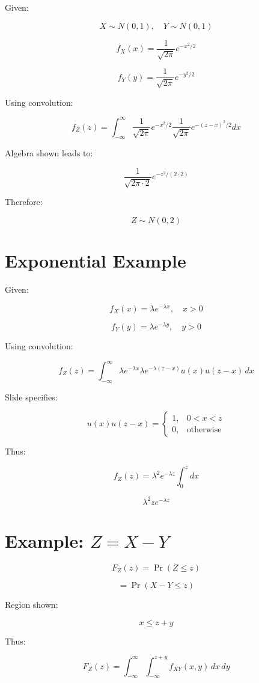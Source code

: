 \documentclass[12pt]{article}
\begin{document}
Given:

\[
X \sim N(0,1), \quad Y \sim N(0,1)
\]

\[
f_X(x)=\frac{1}{\sqrt{2\pi}}e^{-x^2/2}
\]

\[
f_Y(y)=\frac{1}{\sqrt{2\pi}}e^{-y^2/2}
\]

Using convolution:

\[
f_Z(z)
=
\int_{-\infty}^{\infty}
\frac{1}{\sqrt{2\pi}}e^{-x^2/2}
\frac{1}{\sqrt{2\pi}}e^{-(z-x)^2/2}
dx
\]

Algebra shown leads to:

\[
\frac{1}{\sqrt{2\pi\cdot2}}
e^{-z^2/(2\cdot2)}
\]

Therefore:

\[
\boxed{Z \sim N(0,2)}
\]

\section{Exponential Example}

Given:

\[
f_X(x)=\lambda e^{-\lambda x}, \quad x>0
\]

\[
f_Y(y)=\lambda e^{-\lambda y}, \quad y>0
\]

Using convolution:

\[
f_Z(z)
=
\int_{-\infty}^{\infty}
\lambda e^{-\lambda x}
\lambda e^{-\lambda(z-x)}
u(x)u(z-x)\,dx
\]

Slide specifies:

\[
u(x)u(z-x)
=
\begin{cases}
1, & 0<x<z \\
0, & \text{otherwise}
\end{cases}
\]

Thus:

\[
f_Z(z)
=
\lambda^2 e^{-\lambda z}
\int_0^z dx
\]

\[
\lambda^2 z e^{-\lambda z}
\]

\section{Example: \( Z = X - Y \)}

\[
F_Z(z)=\Pr(Z \le z)
\]

\[
=\Pr(X-Y \le z)
\]

Region shown:

\[
x \le z+y
\]

Thus:

\[
F_Z(z)
=
\int_{-\infty}^{\infty}
\int_{-\infty}^{z+y}
f_{XY}(x,y)\,dx\,dy
\]
\end{document}
